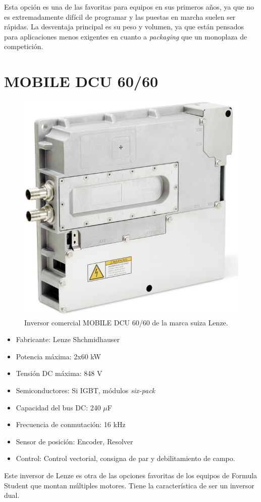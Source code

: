 Esta opción es una de las favoritas para equipos en sus primeros años, ya que no es extremadamente difícil de programar y las puestas en marcha suelen ser rápidas. La desventaja principal es su peso y volumen, ya que están pensados para aplicaciones menos exigentes en cuanto a \textit{packaging} que un monoplaza de competición.

\section{MOBILE DCU 60/60}
\begin{figure}[H]
	\centering
	\includegraphics[width=0.7\linewidth]{fig/lenze}
	\caption{Inversor comercial MOBILE DCU 60/60 de la marca suiza Lenze.}
	\label{fig:lenze}
\end{figure}

\begin{itemize}
\item Fabricante: Lenze Shchmidhauser
\item Potencia máxima: 2x60 kW
\item Tensión DC máxima: 848 V
\item Semiconductores: Si IGBT, módulos \textit{six-pack}
\item Capacidad del bus DC: 240 $\mu$F
\item Frecuencia de conmutación: 16 kHz
\item Sensor de posición: Encoder, Resolver
\item Control: Control vectorial, consigna de par y debilitamiento de campo.
\end{itemize}

Este inversor de Lenze es otra de las opciones favoritas de los equipos de Formula Student que montan múltiples motores. Tiene la característica de ser un inversor dual. 

